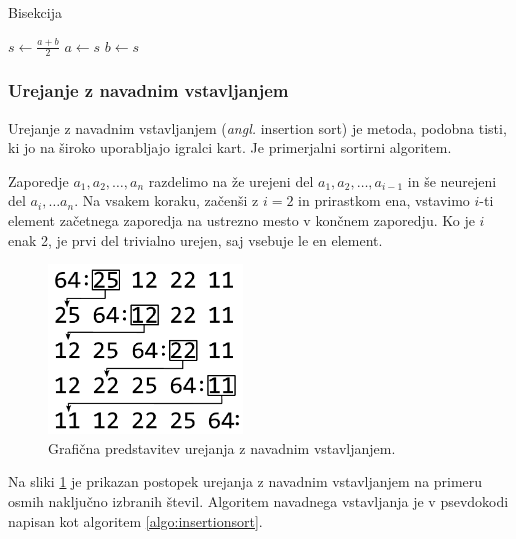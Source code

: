 \documentclass[a4paper,oneside,12pt]{article}
\begin{document}
\begin{algorithm}
  \caption{Bisekcija}\label{algo:bisekcija}
  \begin{algorithmic}[1]
        \State $s \gets \frac{a+b}{2}$
          \State $a \gets s$
        \Else
          \State $b \gets s$
        \EndIf
    \EndWhile
  \end{algorithmic}
\end{algorithm}

\subsubsection{Urejanje z navadnim vstavljanjem}
\label{chapter:insertionsort}
Urejanje z navadnim vstavljanjem (\emph{angl.} insertion sort) je metoda,
podobna tisti, ki jo na široko uporabljajo igralci kart. Je primerjalni sortirni algoritem.

Zaporedje $a_1, a_2, \ldots, a_n$ razdelimo na že urejeni del $a_1, a_2, \ldots, a_{i-1}$
in še neurejeni del $a_i, \ldots a_n$. Na vsakem koraku, začenši z $i = 2$ in
prirastkom ena, vstavimo $i$-ti element začetnega zaporedja na ustrezno mesto v končnem
zaporedju. Ko je $i$ enak 2, je prvi del trivialno urejen, saj vsebuje le en element.

\begin{figure}[h]
    \begin{center}
        \includegraphics[height=45mm]{slike/insertionsort.pdf}
    \end{center}
    \vspace{-0.7cm}
    \caption[Urejanje z vstavljanjem]{Grafična predstavitev urejanja z navadnim vstavljanjem.}
    \label{fig:insertionsortimage}
\end{figure}

Na sliki \ref{fig:insertionsortimage} je prikazan postopek urejanja z navadnim vstavljanjem na primeru osmih naključno
izbranih števil. Algoritem navadnega
vstavljanja je v psevdokodi napisan kot algoritem \ref{algo:insertionsort}.
\end{document}
